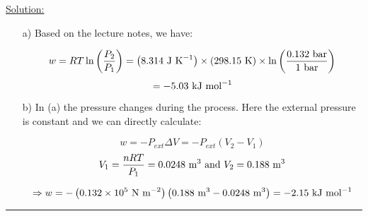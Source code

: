 \noindent
\underline{Solution:}\\

\begin{itemize}
\item[a)] Based on the lecture notes, we have:

$$w = RT\ln\left(\frac{P_2}{P_1}\right) = \left(8.314\textnormal{ J K}^{-1}\right)\times\left(298.15\textnormal{ K}\right)\times\ln\left(\frac{0.132\textnormal{ bar}}{1\textnormal{ bar}}\right)$$
$$ = -5.03\textnormal{ kJ mol}^{-1}$$

\item[b)] In (a) the pressure changes during the process. Here the external pressure is constant and we can directly calculate:

$$w = -P_{ext}\Delta V = -P_{ext}\left(V_2 - V_1\right)$$
$$V_1 = \frac{nRT}{P_1} = 0.0248\textnormal{ m}^3\textnormal{ and }V_2 = 0.188\textnormal{ m}^3$$

$$\Rightarrow w = -\left(0.132\times 10^5\textnormal{ N m}^{-2}\right)\left(0.188\textnormal{ m}^3 - 0.0248\textnormal{ m}^3\right) = -2.15\textnormal{ kJ mol}^{-1}$$

\end{itemize}

\hrule\vspace{0.5cm}
